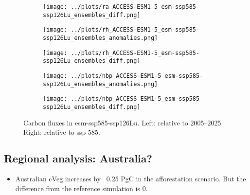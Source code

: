 \documentclass[]{article}
\begin{document}
\begin{figure}[H]
\begin{subfigure}[b]{0.4\linewidth}
    \end{subfigure}
    \begin{subfigure}[b]{0.4\linewidth}
        \texttt{[image: ../plots/ra\_ACCESS-ESM1-5\_esm-ssp585-ssp126Lu\_ensembles\_diff.png]}
    \end{subfigure}
    \begin{subfigure}[b]{0.4\linewidth}
        \texttt{[image: ../plots/rh\_ACCESS-ESM1-5\_esm-ssp585-ssp126Lu\_ensembles\_anomalies.png]}
    \end{subfigure}
    \begin{subfigure}[b]{0.4\linewidth}
        \texttt{[image: ../plots/rh\_ACCESS-ESM1-5\_esm-ssp585-ssp126Lu\_ensembles\_diff.png]}
    \end{subfigure}
    \begin{subfigure}[b]{0.4\linewidth}
        \texttt{[image: ../plots/nbp\_ACCESS-ESM1-5\_esm-ssp585-ssp126Lu\_ensembles\_anomalies.png]}
    \end{subfigure}
    \begin{subfigure}[b]{0.4\linewidth}
        \texttt{[image: ../plots/nbp\_ACCESS-ESM1-5\_esm-ssp585-ssp126Lu\_ensembles\_diff.png]}
    \end{subfigure}
    \caption{Carbon fluxes in esm-ssp585-ssp126Lu.  Left: relative to 2005–2025. Right: relative to ssp-585.}
    \label{fig:cflux}
\end{figure}

\pagebreak

\subsection{Regional analysis: Australia?}

\begin{itemize}
    \item Australian cVeg increases by ~0.25 PgC in the afforestation scenario. But the difference from the reference simulation is 0.
\end{itemize}
\end{document}
